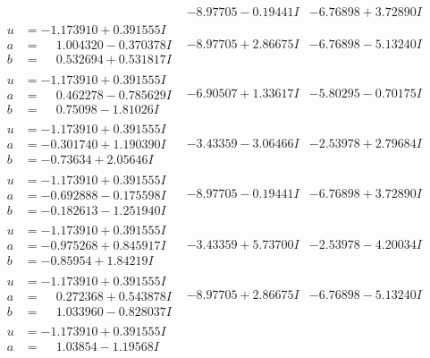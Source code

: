 \documentclass[1p]{elsarticle_modified}
\theoremstyle{definition}
\begin{document}
$$\begin{array}{c|c|c}
 & -8.97705 - 0.19441 I & -6.76898 + 3.72890 I \\ \hline\begin{aligned}
u &= -1.173910 + 0.391555 I \\
a &= \phantom{-}1.004320 - 0.370378 I \\
b &= \phantom{-}0.532694 + 0.531817 I\end{aligned}
 & -8.97705 + 2.86675 I & -6.76898 - 5.13240 I \\ \hline\begin{aligned}
u &= -1.173910 + 0.391555 I \\
a &= \phantom{-}0.462278 - 0.785629 I \\
b &= \phantom{-}0.75098 - 1.81026 I\end{aligned}
 & -6.90507 + 1.33617 I & -5.80295 - 0.70175 I \\ \hline\begin{aligned}
u &= -1.173910 + 0.391555 I \\
a &= -0.301740 + 1.190390 I \\
b &= -0.73634 + 2.05646 I\end{aligned}
 & -3.43359 - 3.06466 I & -2.53978 + 2.79684 I \\ \hline\begin{aligned}
u &= -1.173910 + 0.391555 I \\
a &= -0.692888 - 0.175598 I \\
b &= -0.182613 - 1.251940 I\end{aligned}
 & -8.97705 - 0.19441 I & -6.76898 + 3.72890 I \\ \hline\begin{aligned}
u &= -1.173910 + 0.391555 I \\
a &= -0.975268 + 0.845917 I \\
b &= -0.85954 + 1.84219 I\end{aligned}
 & -3.43359 + 5.73700 I & -2.53978 - 4.20034 I \\ \hline\begin{aligned}
u &= -1.173910 + 0.391555 I \\
a &= \phantom{-}0.272368 + 0.543878 I \\
b &= \phantom{-}1.033960 - 0.828037 I\end{aligned}
 & -8.97705 + 2.86675 I & -6.76898 - 5.13240 I \\ \hline\begin{aligned}
u &= -1.173910 + 0.391555 I \\
a &= \phantom{-}1.03854 - 1.19568 I \\

\end{aligned}
\end{array}$$
\end{document}

